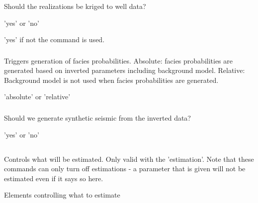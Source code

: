 \subsubsection{}  
 \slist
   \item \Description Should the realizations be kriged to well data?
   \item \Argument 'yes' or 'no'
   \item \Default 'yes' if not the  command is used.
 \elist

\subsubsection{}  
 \slist
   \item \Description Triggers generation of facies probabilities. Absolute: facies probabilities are generated based on inverted parameters including background model. Relative: Background model is not used when facies probabilities are generated.
   \item \Argument 'absolute' or 'relative'
   \item \Default
 \elist

\subsubsection{}  
 \slist
   \item \Description Should we generate synthetic seismic from the inverted data?
   \item \Argument 'yes' or 'no'
   \item \Default
 \elist



\subsection{} 
 \slist
   \item \Description Controls what will be estimated. Only valid with the  'estimation'. Note that these commands can only turn off estimations - a parameter that is given will not be estimated even if it says so here.
   \item \Argument Elements controlling what to estimate
   \item \Default
 \elist

